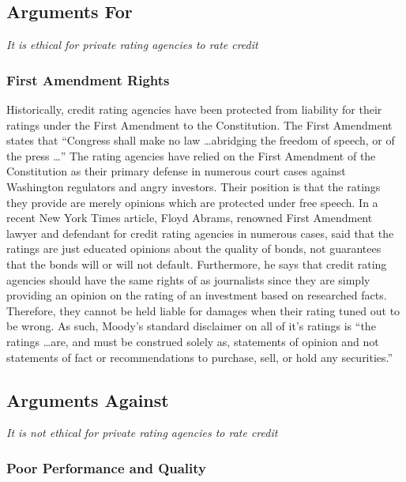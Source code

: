 \documentclass[11pt]{article}
\begin{document}
\begin{multicols}{2}
\subsection{Arguments For}

\textit{It is ethical for private rating agencies to rate credit}

\subsubsection{First Amendment Rights}

Historically, credit rating agencies have been protected from liability for their ratings under the First Amendment to the Constitution. \cite{CivilLiability} The First Amendment states that ``Congress shall make no law \ldots abridging the freedom of speech, or of the press \ldots'' \cite{firstAmendment}  The rating agencies have relied on the First Amendment of the Constitution as their primary defense in numerous court cases against Washington regulators and angry investors. Their position is that the ratings they provide are merely opinions which are protected under free speech. \cite{CivilLiability, CRS} In a recent New York Times article, Floyd Abrams, renowned First Amendment lawyer and defendant for credit rating agencies in numerous cases, said that the ratings are just educated opinions about the quality of bonds, not guarantees that the bonds will or will not default.  Furthermore, he says that credit rating agencies should have the same rights of as journalists since they are simply providing an opinion on the rating of an investment based on researched facts.  Therefore, they cannot be held liable for damages when their rating tuned out to be wrong.  \cite{nyTimesFirstAmendment}  As such, Moody's standard disclaimer on all of it's ratings is ``the ratings \ldots are, and must be construed solely as, statements of opinion and not statements of fact or recommendations to purchase, sell, or hold any securities.'' \cite[p.120]{govtReport}
\newline
\newline

\subsection{Arguments Against}

\textit{It is not ethical for private rating agencies to rate credit}

\subsubsection{Poor Performance and Quality}


\end{multicols}
\end{document}
